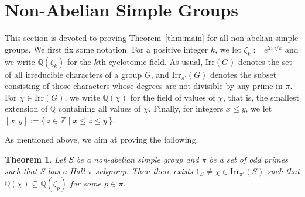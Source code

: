 \documentclass[12pt]{amsart}
\newtheorem{theorem}{Theorem}[section]
\theoremstyle{definition}
\numberwithin{equation}{section}
\newcommand{\Irr}{{\mathrm {Irr}}}
\newcommand{\QQ}{{\mathbb Q}}
\newcommand{\ZZ}{{\mathbb Z}}
\newcommand{\Al}{\textup{\textsf{A}}}
\newcommand{\Sy}{\textup{\textsf{S}}}
\begin{document}
%


\section{Non-Abelian Simple Groups}

This section is devoted to proving Theorem~\ref{thm:main} for all
non-abelian simple groups. We first fix some notation. For a
positive integer $k$, we %
let $\zeta_k:=e^{2\pi i/k}$ and %
we write $\QQ(\zeta_k)$ for the $k$th
cyclotomic field. As usual, $\Irr(G)$ denotes
the set of all irreducible characters of a group $G$, and
$\Irr_{\pi'}(G)$ denotes the subset consisting of those characters
whose degrees are not divisible by any prime in $\pi$. For
$\chi\in\Irr(G)$, we write $\QQ(\chi)$ for the field of values of
$\chi$, that is, the smallest extension of $\QQ$ containing all
values of $\chi$. Finally, for integers $x\le y$, we let
$[x,y]:=\{\,z\in\ZZ \mid x\le z\le y\,\}$.

As mentioned above, we aim at proving the following.

\begin{theorem}\label{thm:simple}
Let $S$ be a non-abelian simple group and $\pi$ be a set of odd
primes such that $S$ has a Hall $\pi$-subgroup. Then there exists
$1_S\neq\chi\in\Irr_{\pi'}(S)$ such %
that
$\QQ(\chi)\subseteq\QQ(\zeta_p)$ for %
some $p\in\pi$.
\end{theorem}
\end{document}

